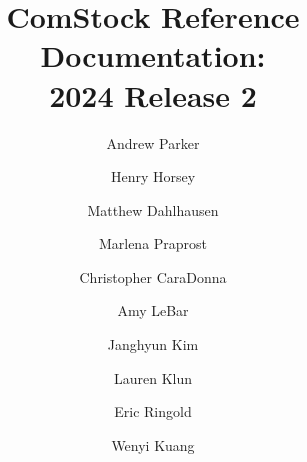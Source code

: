 \documentclass[]{nrel}
\title{ComStock Reference Documentation: \\ 2024 Release 2}
\author{Andrew Parker}
\author{Henry Horsey}
\author{Matthew Dahlhausen}
\author{Marlena Praprost}
\author{Christopher CaraDonna}
\author{Amy LeBar}
\author{Janghyun Kim}
\author{Lauren Klun}
\author{Eric Ringold}
\author{Wenyi Kuang}
\affil{National Renewable Energy Laboratory}
\begin{document}
\frontmatter





\mainmatter
\tableofcontents

\listoffigures

\listoftables




\label{chap:3_sampling}












\cleardoublepage
\label{sec:Bib}
\printbibliography[title={\LARGE References}]
\begin{appendices} %




\end{appendices}
\end{document}
